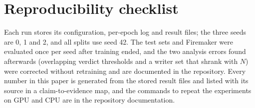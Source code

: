 \section{Reproducibility checklist}
\label{app:repro}
\begin{table}[t]
\caption{Where each part of the study lives in the project repository.}
\label{tab:repo}
\centering\scriptsize
\setlength{\tabcolsep}{3pt}
\end{table}
Each run stores its configuration, per-epoch log and result files; the three seeds are 0, 1 and 2, and all splits use seed 42.
The test sets and Firemaker were evaluated once per seed after training ended, and the two analysis errors found afterwards (overlapping verdict thresholds and a writer set that shrank with $N$) were corrected without retraining and are documented in the repository.
Every number in this paper is generated from the stored result files and listed with its source in a claim-to-evidence map, and the commands to repeat the experiments on GPU and CPU are in the repository documentation.
